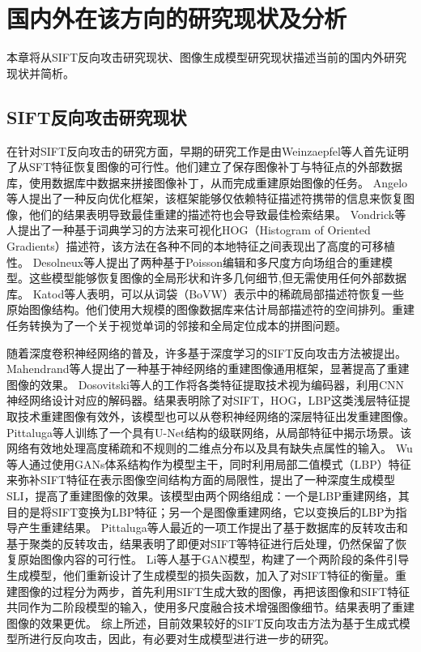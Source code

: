\section{国内外在该方向的研究现状及分析}
本章将从SIFT反向攻击研究现状、图像生成模型研究现状描述当前的国内外研究现状并简析。
\subsection{SIFT反向攻击研究现状}
在针对SIFT反向攻击的研究方面，早期的研究工作是由Weinzaepfel等人\cite{5995616}首先证明了从SFT特征恢复图像的可行性。他们建立了保存图像补丁与特征点的外部数据库，使用数据库中数据来拼接图像补丁，从而完成重建原始图像的任务。
Angelo等人\cite{6460288}提出了一种反向优化框架，该框架能够仅依赖特征描述符携带的信息来恢复图像，他们的结果表明导致最佳重建的描述符也会导致最佳检索结果。
Vondrick等人\cite{Vondrick_2013_ICCV}提出了一种基于词典学习的方法来可视化HOG（Histogram of Oriented Gradients）描述符，该方法在各种不同的本地特征之间表现出了高度的可移植性。
Desolneux等人\cite{10.1007/978-3-319-58771-4_11}提出了两种基于Poisson编辑和多尺度方向场组合的重建模型。这些模型能够恢复图像的全局形状和许多几何细节,但无需使用任何外部数据库。
Katod等人\cite{Kato_2014_CVPR}表明，可以从词袋（BoVW）表示中的稀疏局部描述符恢复一些原始图像结构。他们使用大规模的图像数据库来估计局部描述符的空间排列。重建任务转换为了一个关于视觉单词的邻接和全局定位成本的拼图问题。
\par
随着深度卷积神经网络的普及，许多基于深度学习的SIFT反向攻击方法被提出。
Mahendrand等人\cite{Mahendran_2015_CVPR}提出了一种基于神经网络的重建图像通用框架，显著提高了重建图像的效果。
Dosovitski等人\cite{Dosovitskiy_2016_CVPR}的工作将各类特征提取技术视为编码器，利用CNN神经网络设计对应的解码器。结果表明除了对SIFT，HOG，LBP这类浅层特征提取技术重建图像有效外，该模型也可以从卷积神经网络的深层特征出发重建图像。
Pittaluga等人\cite{Pittaluga_2019_CVPR}训练了一个具有U-Net结构的级联网络，从局部特征中揭示场景。该网络有效地处理高度稀疏和不规则的二维点分布以及具有缺失点属性的输入。
Wu等人\cite{9393327}通过使用GANs体系结构作为模型主干，同时利用局部二值模式（LBP）特征来弥补SIFT特征在表示图像空间结构方面的局限性，提出了一种深度生成模型SLI，提高了重建图像的效果。该模型由两个网络组成：一个是LBP重建网络，其目的是将SIFT变换为LBP特征；另一个是图像重建网络，它以变换后的LBP为指导产生重建结果。
Pittaluga等人\cite{Pittaluga_2023_ICCV}最近的一项工作提出了基于数据库的反转攻击和基于聚类的反转攻击，结果表明了即便对SIFT等特征进行后处理，仍然保留了恢复原始图像内容的可行性。
Li等人\cite{liDeepReverseAttack2024}基于GAN模型，构建了一个两阶段的条件引导生成模型，他们重新设计了生成模型的损失函数，加入了对SIFT特征的衡量。重建图像的过程分为两步，首先利用SIFT生成大致的图像，再把该图像和SIFT特征共同作为二阶段模型的输入，使用多尺度融合技术增强图像细节。结果表明了重建图像的效果更优。
综上所述，目前效果较好的SIFT反向攻击方法为基于生成式模型所进行反向攻击，因此，有必要对生成模型进行进一步的研究。

